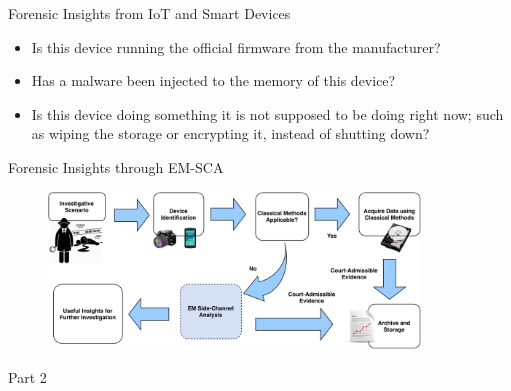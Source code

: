 \documentclass[handout]{beamer}
\begin{document}
\begin{frame}{Forensic Insights from IoT and Smart Devices}  

	\begin{itemize}
	\footnotesize
	\item Is this device running the official firmware from the manufacturer?
		\vspace{10pt}
	\item Has a malware been injected to the memory of this device?
		\vspace{10pt}
	\item Is this device doing something it is not supposed to be doing right now; such as wiping the storage or encrypting it, instead of shutting down?
	\end{itemize}

\end{frame}


\begin{frame}{Forensic Insights through EM-SCA}  

	\begin{figure}
		\includegraphics[width=280pt]{figures/applying-em-sca-to-forensic-process.pdf}
	\end{figure}

\end{frame}



\begin{frame}{}  

	\begin{block}{Part 2}
	\end{block}

\end{frame}
\end{document}
